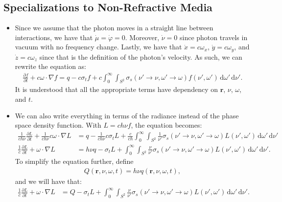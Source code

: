 \documentclass[10pt]{article}
\newcommand{\dee}{\mathrm{d}}
\newcommand{\ve}[1]{\mathbf{#1}}
\newcommand{\ra}{\rightarrow}
\begin{document}
  \subsection{Specializations to Non-Refractive Media}
  \begin{itemize}
    \item Since we assume that the photon moves in a straight line between interactions, we have that $\dot \mu = \dot \varphi = 0$. Moreover, $\dot \nu = 0$ since photon travels in vacuum with no frequency change. Lastly,
    we have that $\dot x = c \omega_x$, $\dot y = c \omega_y$, and $\dot z = c \omega_z$ since that is the definition of the photon's velocity. As such, we can rewrite the equation as:
    \begin{align*}
      \frac{\partial f}{\partial t} 
      + c \omega \cdot \nabla f
      = q -c \sigma_t f
      +c \int_{0}^\infty \int_{S^2} \sigma_s(\nu' \ra \nu, \omega' \ra \omega) f(\nu', \omega')\, \dee \omega'\, \dee \nu'.
    \end{align*}    
    It is understood that all the appropriate terms have dependency on $\ve{r}$, $\nu$, $\omega$, and $t$.

    \item We can also write everything in terms of the radiance instead of the phase space density function. With $L = c h \nu f$, the equation becomes:
    \begin{align*}
      \frac{1}{ch\nu}\frac{\partial L}{\partial t} 
      + \frac{1}{ch\nu} c \omega \cdot \nabla L
      &= q - \frac{1}{ch\nu} c \sigma_t L
      +  \frac{c}{ch} \int_{0}^\infty \int_{S^2} \frac{1}{\nu'} \sigma_s(\nu' \ra \nu, \omega' \ra \omega) L(\nu', \omega')\, \dee \omega'\, \dee \nu'\\
      \frac{1}{c}\frac{\partial L}{\partial t} 
      +  \omega \cdot \nabla L
      &= h\nu q - \sigma_t L
      +  \int_{0}^\infty \int_{S^2} \frac{\nu}{\nu'} \sigma_s(\nu' \ra \nu, \omega' \ra \omega) L(\nu', \omega')\, \dee \omega'\, \dee \nu'.
    \end{align*}
    To simplify the equation further, define
    \begin{align*}
      Q(\ve{r}, \nu, \omega, t) = h \nu q(\ve{r}, \nu, \omega, t),
    \end{align*}
    and we will have that:
    \begin{align*}
      \frac{1}{c}\frac{\partial L}{\partial t} 
      +  \omega \cdot \nabla L
      &= Q - \sigma_t L
      +  \int_{0}^\infty \int_{S^2} \frac{\nu}{\nu'} \sigma_s(\nu' \ra \nu, \omega' \ra \omega) L(\nu', \omega')\, \dee \omega'\, \dee \nu'.
    \end{align*}


\end{itemize}
\end{document}
